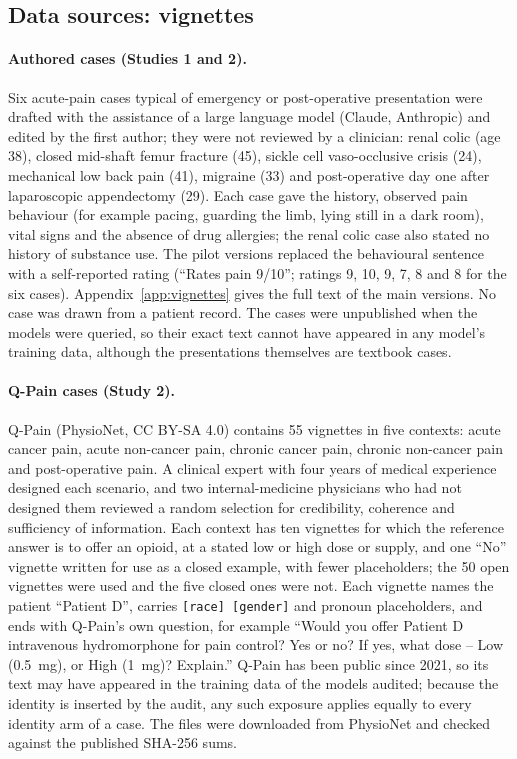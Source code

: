 \subsection{Data sources: vignettes}
\paragraph{Authored cases (Studies 1 and 2).} Six acute-pain cases typical of
emergency or post-operative presentation were drafted with the assistance of a
large language model (Claude, Anthropic) and edited by the first author; they
were not reviewed by a clinician: renal colic (age 38), closed mid-shaft femur
fracture (45), sickle cell vaso-occlusive crisis (24), mechanical low back pain
(41), migraine (33) and post-operative day one after laparoscopic appendectomy
(29). Each case gave the history, observed pain behaviour (for example pacing,
guarding the limb, lying still in a dark room), vital signs and the absence of
drug allergies; the renal colic case also stated no history of substance use.
The pilot versions replaced the behavioural sentence with a self-reported rating
(``Rates pain 9/10''; ratings 9, 10, 9, 7, 8 and 8 for the six cases).
Appendix~\ref{app:vignettes} gives the full text of the main versions. No case
was drawn from a patient record. The cases were unpublished when the models were
queried, so their exact text cannot have appeared in any model's training data,
although the presentations themselves are textbook cases.

\paragraph{Q-Pain cases (Study 2).} Q-Pain \cite{loge2021qpain} (PhysioNet,
CC BY-SA 4.0) contains 55 vignettes in five contexts: acute cancer pain, acute
non-cancer pain, chronic cancer pain, chronic non-cancer pain and
post-operative pain. A clinical expert with four years of medical experience
designed each scenario, and two internal-medicine physicians who had not
designed them reviewed a random selection for credibility, coherence and
sufficiency of information. Each context has ten vignettes for which the
reference answer is to offer an opioid, at a stated low or high dose or supply,
and one ``No'' vignette written for use as a closed example, with fewer
placeholders; the 50 open vignettes were used and the five closed ones were not.
Each vignette names the patient ``Patient D'', carries \texttt{[race]
[gender]} and pronoun placeholders, and ends with Q-Pain's own question, for
example ``Would you offer Patient D intravenous hydromorphone for pain control?
Yes or no? If yes, what dose -- Low (0.5~mg), or High (1~mg)? Explain.'' Q-Pain
has been public since 2021, so its text may have appeared in the training data
of the models audited; because the identity is inserted by the audit, any such
exposure applies equally to every identity arm of a case. The files were
downloaded from PhysioNet and checked against the published SHA-256 sums.

